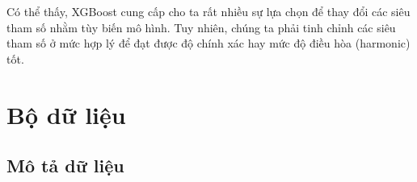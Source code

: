 \documentclass{article}
\begin{document}
Có thể thấy, XGBoost cung cấp cho ta rất nhiều sự lựa chọn để thay đổi các siêu tham số nhằm tùy biến mô hình. Tuy nhiên, chúng ta phải tinh chỉnh các siêu tham số ở mức hợp lý để đạt được độ chính xác hay mức độ điều hòa (harmonic) tốt.
\section{Bộ dữ liệu}
\subsection{Mô tả dữ liệu}







\end{document}
